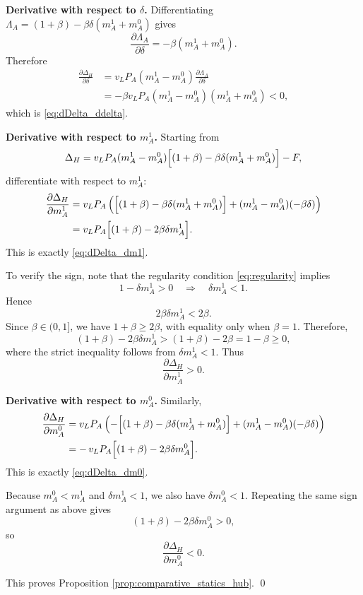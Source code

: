 \noindent\textbf{Derivative with respect to $\delta$.}
Differentiating $\Lambda_A=(1+\beta)-\beta\delta(m_A^1+m_A^0)$ gives
\[
\frac{\partial \Lambda_A}{\partial \delta}=-\beta(m_A^1+m_A^0).
\]
Therefore
\begin{align}
\frac{\partial \Delta_H}{\partial \delta}
&=
v_L P_A(m_A^1-m_A^0)\frac{\partial \Lambda_A}{\partial \delta}
\nonumber\\
&=
-\beta v_L P_A(m_A^1-m_A^0)(m_A^1+m_A^0)
<0,
\label{eq:app4_dDelta_ddelta}
\end{align}
which is \eqref{eq:dDelta_ddelta}.

\noindent\textbf{Derivative with respect to $m_A^1$.}
Starting from
\[
\Delta_H=v_L P_A(m_A^1-m_A^0)\Bigl[(1+\beta)-\beta\delta(m_A^1+m_A^0)\Bigr]-F,
\]
differentiate with respect to $m_A^1$:
\begin{align}
\frac{\partial \Delta_H}{\partial m_A^1}
&=
v_L P_A
\left(
\Bigl[(1+\beta)-\beta\delta(m_A^1+m_A^0)\Bigr]
+
(m_A^1-m_A^0)(-\beta\delta)
\right)
\nonumber\\
&=
v_L P_A\Bigl[(1+\beta)-2\beta\delta m_A^1\Bigr].
\label{eq:app4_dDelta_dm1_raw}
\end{align}
This is exactly \eqref{eq:dDelta_dm1}.

To verify the sign, note that the regularity condition \eqref{eq:regularity} implies
\[
1-\delta m_A^1>0
\quad\Longrightarrow\quad
\delta m_A^1<1.
\]
Hence
\[
2\beta\delta m_A^1<2\beta.
\]
Since $\beta\in(0,1]$, we have $1+\beta\ge 2\beta$, with equality only when $\beta=1$. Therefore,
\[
(1+\beta)-2\beta\delta m_A^1>(1+\beta)-2\beta=1-\beta\ge 0,
\]
where the strict inequality follows from $\delta m_A^1<1$. Thus
\begin{equation}
\frac{\partial \Delta_H}{\partial m_A^1}>0.
\label{eq:app4_dDelta_dm1_sign}
\end{equation}

\noindent\textbf{Derivative with respect to $m_A^0$.}
Similarly,
\begin{align}
\frac{\partial \Delta_H}{\partial m_A^0}
&=
v_L P_A
\left(
-\Bigl[(1+\beta)-\beta\delta(m_A^1+m_A^0)\Bigr]
+
(m_A^1-m_A^0)(-\beta\delta)
\right)
\nonumber\\
&=
-\,v_L P_A\Bigl[(1+\beta)-2\beta\delta m_A^0\Bigr].
\label{eq:app4_dDelta_dm0_raw}
\end{align}
This is exactly \eqref{eq:dDelta_dm0}.

Because $m_A^0<m_A^1$ and $\delta m_A^1<1$, we also have $\delta m_A^0<1$. Repeating the same sign argument as above gives
\[
(1+\beta)-2\beta\delta m_A^0>0,
\]
so
\begin{equation}
\frac{\partial \Delta_H}{\partial m_A^0}<0.
\label{eq:app4_dDelta_dm0_sign}
\end{equation}

This proves Proposition \ref{prop:comparative_statics_hub}.
\qed
